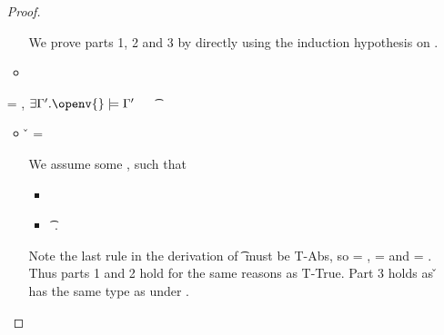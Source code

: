 \begin{lemma}
\begin{enumerate}
\begin{proof}
\begin{case}[T-Let]
\begin{itemize}
\begin{subcase}[B-Let]
        We prove parts 1, 2 and 3 by directly using the induction hypothesis on .
      \end{subcase}
    \item[]
      \begin{subcase}[BE-Let]
      \end{subcase}
  \end{itemize}
\end{case}

\begin{case}[T-Clos] \e{} = {\closure {\openv{}} {\abs {\x{}} {\s{}} {}}},
  {\thenprop {\prop{}}}
  $\exists {\propenvp{}}. \satisfies{\openv{}}{\propenvp{}}$
  \ \ 
\judgement {\propenvp{}} { {\t{}}}
                 {\filterset {\thenprop {\prop{}}}
                             {\elseprop {\prop{}}}}
                 {\object{}}

  \begin{itemize}
    \item[]
      \begin{subcase}[B-Abs] \v{} = {\closure {\openv{}} {\abs {\x{}} {\s{}} {}}}

        We assume some \propenvp{}, such that
        \begin{itemize}
          \item \satisfies{\openv{}}{\propenvp{}}
          \item \judgement {\propenvp{}} { {\t{}}}
                           {\filterset {\thenprop {\prop{}}}
                                       {\elseprop {\prop{}}}}
                           {\object{}}.
       \end{itemize}
       Note the last rule in the derivation of
          \judgement {\propenvp{}} { {\t{}}}
                           {\filterset {\thenprop {\prop{}}}
                                       {\elseprop {\prop{}}}}
                           {\object{}}
                           must be T-Abs, so 
                           {\thenprop {\prop{}}} = {\topprop{}},
                           {\elseprop {\prop{}}} = {\botprop{}}
                           and {\object{}} = {\emptyobject{}}.
         Thus parts 1 and 2 hold for the same reasons as T-True.
         Part 3 holds as \v{} has the same type as {\abs {\x{}} {\s{}} {}}
         under \propenvp{}.

      \end{subcase} 
  \end{itemize}
\end{case}


\end{proof}
\end{enumerate}
\end{lemma}
